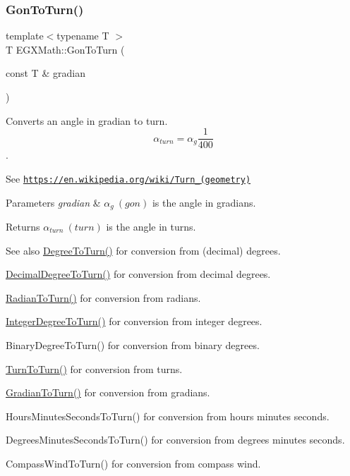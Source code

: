\mbox{\label{group___e_g_x_math-_angle_conversions-_gon_gae55acf3fc27d34374b5ec10e0a471b3b}} 
\subsubsection{\texorpdfstring{Gon\+To\+Turn()}{GonToTurn()}}
{\footnotesize\ttfamily template$<$typename T $>$ \\
T E\+G\+X\+Math\+::\+Gon\+To\+Turn (\begin{DoxyParamCaption}\item[{const T \&}]{gradian }\end{DoxyParamCaption})}



Converts an angle in gradian to turn. \[\alpha_{turn}=\alpha_{g}\frac{1}{400}\]. 

See \href{https://en.wikipedia.org/wiki/Turn_(geometry)}{\tt https\+://en.\+wikipedia.\+org/wiki/\+Turn\+\_\+(geometry)} 
\begin{DoxyParams}{Parameters}
{\em gradian} & $\alpha_{g}\ (gon)$ is the angle in gradians. \\
\hline
\end{DoxyParams}
\begin{DoxyReturn}{Returns}
$\alpha_{turn}\ (turn)$ is the angle in turns. 
\end{DoxyReturn}
\begin{DoxySeeAlso}{See also}
\mbox{\hyperlink{group___e_g_x_math-_angle_conversions-_degree_gafb4ce930493a7d6202ede3ee1630ef5d}{Degree\+To\+Turn()}} for conversion from (decimal) degrees. 

\mbox{\hyperlink{group___e_g_x_math-_angle_conversions-_decimal_degree_ga396a13c10acdef5026c12f3217b142c1}{Decimal\+Degree\+To\+Turn()}} for conversion from decimal degrees. 

\mbox{\hyperlink{group___e_g_x_math-_angle_conversions-_radian_ga8492d6d2f6467c619b65e5fb75a9ae04}{Radian\+To\+Turn()}} for conversion from radians. 

\mbox{\hyperlink{group___e_g_x_math-_angle_conversions-_integer_degree_ga06ddbdada5a3978105c855d4aae735ae}{Integer\+Degree\+To\+Turn()}} for conversion from integer degrees. 

Binary\+Degree\+To\+Turn() for conversion from binary degrees. 

\mbox{\hyperlink{group___e_g_x_math-_angle_conversions-_turn_ga32c8dfa2861fefd0b18e36f8d6d95ed4}{Turn\+To\+Turn()}} for conversion from turns. 

\mbox{\hyperlink{group___e_g_x_math-_angle_conversions-_gradian_ga11b42138910d26474f47c0a2043911c9}{Gradian\+To\+Turn()}} for conversion from gradians. 

Hours\+Minutes\+Seconds\+To\+Turn() for conversion from hours minutes seconds. 

Degrees\+Minutes\+Seconds\+To\+Turn() for conversion from degrees minutes seconds. 

Compass\+Wind\+To\+Turn() for conversion from compass wind. 
\end{DoxySeeAlso}
